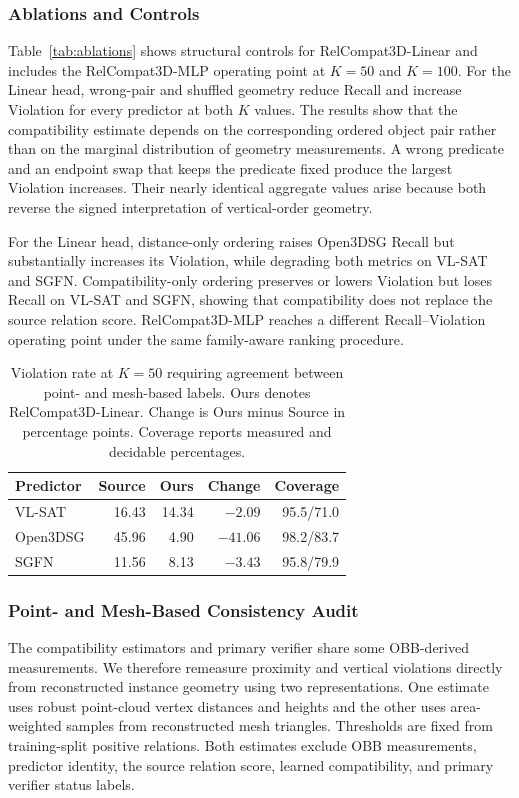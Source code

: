 \subsubsection{Ablations and Controls}
Table~\ref{tab:ablations} shows structural controls for RelCompat3D-Linear and includes the RelCompat3D-MLP operating point at $K=50$ and $K=100$. For the Linear head, wrong-pair and shuffled geometry reduce Recall and increase Violation for every predictor at both $K$ values. The results show that the compatibility estimate depends on the corresponding ordered object pair rather than on the marginal distribution of geometry measurements. A wrong predicate and an endpoint swap that keeps the predicate fixed produce the largest Violation increases. Their nearly identical aggregate values arise because both reverse the signed interpretation of vertical-order geometry. 

For the Linear head, distance-only ordering raises Open3DSG Recall but substantially increases its Violation, while degrading both metrics on VL-SAT and SGFN. Compatibility-only ordering preserves or lowers Violation but loses Recall on VL-SAT and SGFN, showing that compatibility does not replace the source relation score. RelCompat3D-MLP reaches a different Recall--Violation operating point under the same family-aware ranking procedure. 

\begin{table}[t]
    \centering
    {\small
    \setlength{\tabcolsep}{1.5pt}
    \begin{tabular}{@{}lrrrr@{}}
    \toprule
    Predictor & Source & Ours & Change & Coverage \\
    \midrule
    VL-SAT   & 16.43 & 14.34 & $-2.09$ & 95.5/71.0 \\
    Open3DSG & 45.96 & 4.90  & $-41.06$ & 98.2/83.7 \\
    SGFN     & 11.56 & 8.13  & $-3.43$ & 95.8/79.9 \\
    \bottomrule
    \end{tabular}
    }
    \caption{Violation rate at $K=50$ requiring agreement between point- and mesh-based labels. Ours denotes RelCompat3D-Linear. Change is Ours minus Source in percentage points. Coverage reports measured and decidable percentages.}
    \label{tab:surface-audit}
\end{table}

\subsubsection{Point- and Mesh-Based Consistency Audit}
The compatibility estimators and primary verifier share some OBB-derived measurements. We therefore remeasure proximity and vertical violations directly from reconstructed instance geometry using two representations. One estimate uses robust point-cloud vertex distances and heights and the other uses area-weighted samples from reconstructed mesh triangles. Thresholds are fixed from training-split positive relations. Both estimates exclude OBB measurements, predictor identity, the source relation score, learned compatibility, and primary verifier status labels.

